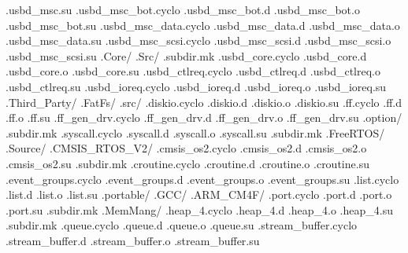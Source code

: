 \documentclass{article}
\begin{document}
{                  .usbd_msc.su
                  .usbd_msc_bot.cyclo
                  .usbd_msc_bot.d
                  .usbd_msc_bot.o
                  .usbd_msc_bot.su
                  .usbd_msc_data.cyclo
                  .usbd_msc_data.d
                  .usbd_msc_data.o
                  .usbd_msc_data.su
                  .usbd_msc_scsi.cyclo
                  .usbd_msc_scsi.d
                  .usbd_msc_scsi.o
                  .usbd_msc_scsi.su
            .Core/
              .Src/
                .subdir.mk
                .usbd_core.cyclo
                .usbd_core.d
                .usbd_core.o
                .usbd_core.su
                .usbd_ctlreq.cyclo
                .usbd_ctlreq.d
                .usbd_ctlreq.o
                .usbd_ctlreq.su
                .usbd_ioreq.cyclo
                .usbd_ioreq.d
                .usbd_ioreq.o
                .usbd_ioreq.su
        .Third_Party/
          .FatFs/
            .src/
              .diskio.cyclo
              .diskio.d
              .diskio.o
              .diskio.su
              .ff.cyclo
              .ff.d
              .ff.o
              .ff.su
              .ff_gen_drv.cyclo
              .ff_gen_drv.d
              .ff_gen_drv.o
              .ff_gen_drv.su
              .option/
                .subdir.mk
                .syscall.cyclo
                .syscall.d
                .syscall.o
                .syscall.su
              .subdir.mk
          .FreeRTOS/
            .Source/
              .CMSIS_RTOS_V2/
                .cmsis_os2.cyclo
                .cmsis_os2.d
                .cmsis_os2.o
                .cmsis_os2.su
                .subdir.mk
              .croutine.cyclo
              .croutine.d
              .croutine.o
              .croutine.su
              .event_groups.cyclo
              .event_groups.d
              .event_groups.o
              .event_groups.su
              .list.cyclo
              .list.d
              .list.o
              .list.su
              .portable/
                .GCC/
                  .ARM_CM4F/
                    .port.cyclo
                    .port.d
                    .port.o
                    .port.su
                    .subdir.mk
                .MemMang/
                  .heap_4.cyclo
                  .heap_4.d
                  .heap_4.o
                  .heap_4.su
                  .subdir.mk
              .queue.cyclo
              .queue.d
              .queue.o
              .queue.su
              .stream_buffer.cyclo
              .stream_buffer.d
              .stream_buffer.o
              .stream_buffer.su
}
\end{document}
